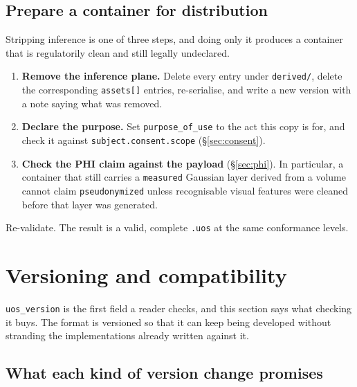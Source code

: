 \documentclass[11pt,a4paper]{article}
\newcommand{\code}[1]{\texttt{\small #1}}
\begin{document}
\subsection{Prepare a container for distribution}

Stripping inference is one of three steps, and doing only it produces a container that is
regulatorily clean and still legally undeclared.

\begin{enumerate}
  \item \textbf{Remove the inference plane.} Delete every entry under \code{derived/},
  delete the corresponding \code{assets[]} entries, re-serialise, and write a new version
  with a note saying what was removed.
  \item \textbf{Declare the purpose.} Set \code{purpose\_of\_use} to the act this copy is
  for, and check it against \code{subject.consent.scope} (\S\ref{sec:consent}).
  \item \textbf{Check the PHI claim against the payload} (\S\ref{sec:phi}). In particular,
  a container that still carries a \code{measured} Gaussian layer derived from a volume
  cannot claim \code{pseudonymized} unless recognisable visual features were cleaned before
  that layer was generated.
\end{enumerate}

Re-validate. The result is a valid, complete \code{.uos} at the same conformance levels.

\section{Versioning and compatibility}\label{sec:versioning}

\code{uos\_version} is the first field a reader checks, and this section says what checking
it buys. The format is versioned so that it can keep being developed without stranding the
implementations already written against it.

\subsection{What each kind of version change promises}
\end{document}

